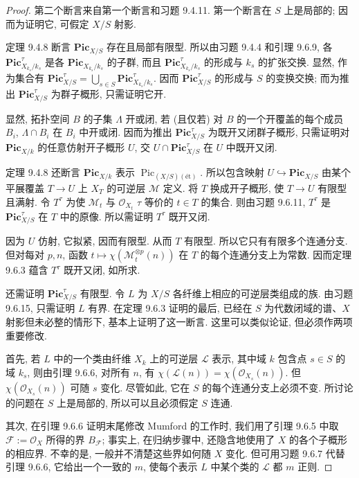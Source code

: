 \begin{proof}
第二个断言来自第一个断言和习题 9.4.11. 第一个断言在 $S$ 上是局部的; 因而为证明它, 可假定 $X/S$ 射影.

定理 9.4.8 断言 $\mathbf{Pic}_{X/S}$ 存在且局部有限型. 所以由习题 9.4.4 和引理 9.6.9, 各 $\mathbf{Pic}_{X_{k_s}/k_s}^{\tau}$ 是各 $\mathbf{Pic}_{X_{k_s}/k_s}$ 的子群, 而且 $\mathbf{Pic}_{X_{k_s}/k_s}^{\tau}$ 的形成与 $k_s$ 的扩张交换. 显然, 作为集合有 $\mathbf{Pic}_{X/S}^{\tau}=\bigcup_{s\in S}\mathbf{Pic}_{X_{k_s}/k_s}^{\tau}$. 因而 $\mathbf{Pic}_{X/S}^{\tau}$ 的形成与 $S$ 的变换交换; 而为推出 $\mathbf{Pic}_{X/S}^{\tau}$ 为群子概形, 只需证明它开.

显然, 拓扑空间 $B$ 的子集 $\Lambda$ 开或闭, 若 (且仅若) 对 $B$ 的一个开覆盖的每个成员 $B_i$, $\Lambda\cap B_i$ 在 $B_i$ 中开或闭. 因而为推出 $\mathbf{Pic}_{X/S}^{\tau}$ 为既开又闭群子概形, 只需证明对 $\mathbf{Pic}_{X/k}$ 的任意仿射开子概形 $U$, 交 $U\cap\mathbf{Pic}_{X/S}^{\tau}$ 在 $U$ 中既开又闭.

定理 9.4.8 还断言 $\mathbf{Pic}_{X/k}$ 表示 $\operatorname{Pic}_{(X/S)(\text{ét})}$. 所以包含映射 $U\hookrightarrow\mathbf{Pic}_{X/S}$ 由某个平展覆盖 $T\to U$ 上 $X_T$ 的可逆层 $\mathcal M$ 定义. 将 $T$ 换成开子概形, 使 $T\to U$ 有限型且满射. 令 $T^{\tau}$ 为使 $\mathcal M_t$ 与 $\mathcal O_{X_t}$ $\tau$ 等价的 $t\in T$ 的集合. 则由习题 9.6.11, $T^{\tau}$ 是 $\mathbf{Pic}_{X/S}^{\tau}$ 在 $T$ 中的原像. 所以需证明 $T^{\tau}$ 既开又闭.

因为 $U$ 仿射, 它拟紧, 因而有限型. 从而 $T$ 有限型. 所以它只有有限多个连通分支. 但对每对 $p,n$, 函数 $t\mapsto\chi(\mathcal M_t^{\otimes p}(n))$ 在 $T$ 的每个连通分支上为常数. 因而定理 9.6.3 蕴含 $T^{\tau}$ 既开又闭, 如所求.

还需证明 $\mathbf{Pic}_{X/S}^{\tau}$ 有限型. 令 $L$ 为 $X/S$ 各纤维上相应的可逆层类组成的族. 由习题 9.6.15, 只需证明 $L$ 有界. 在定理 9.6.3 证明的最后, 已经在 $S$ 为代数闭域的谱、$X$ 射影但未必整的情形下, 基本上证明了这一断言.
这里可以类似论证, 但必须作两项重要修改.

首先, 若 $L$ 中的一个类由纤维 $X_k$ 上的可逆层 $\mathcal L$ 表示, 其中域 $k$ 包含点 $s\in S$ 的域 $k_s$, 则由引理 9.6.6, 对所有 $n$, 有 $\chi(\mathcal L(n))=\chi(\mathcal O_{X_s}(n))$. 但 $\chi(\mathcal O_{X_s}(n))$ 可随 $s$ 变化. 尽管如此, 它在 $S$ 的每个连通分支上必须不变. 所讨论的问题在 $S$ 上是局部的, 所以可以且必须假定 $S$ 连通.

其次, 在引理 9.6.6 证明末尾修改 Mumford 的工作时, 我们用了引理 9.6.5 中取 $\mathcal F:=\mathcal O_X$ 所得的界 $B_{\mathcal F}$; 事实上, 在归纳步骤中, 还隐含地使用了 $X$ 的各个子概形的相应界. 不幸的是, 一般并不清楚这些界如何随 $X$ 变化. 但可用习题 9.6.7 代替引理 9.6.6, 它给出一个一致的 $m$, 使每个表示 $L$ 中某个类的 $\mathcal L$ 都 $m$ 正则.
\end{proof}

